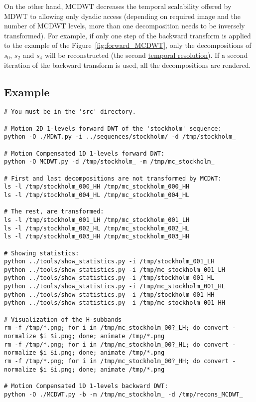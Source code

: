 On the other hand, MCDWT decreases the temporal scalability offered by
MDWT to allowing only dyadic access (depending on required image and
the number of MCDWT levels, more than one decomposition needs to be
inversely transformed). For example, if only one step of the backward
transform is applied to the example of the
Figure~\ref{fig:forward_MCDWT}, only the decompositions of $s_0$,
$s_2$ and $s_4$ will be reconstructed (the second
\href{https://en.wikipedia.org/wiki/Temporal_resolution}{temporal
  resolution}). If a second iteration of the backward transform is
used, all the decompositions are rendered.

\subsection{Example}
\begin{verbatim}
# You must be in the 'src' directory.

# Motion 2D 1-levels forward DWT of the 'stockholm' sequence:
python -O ./MDWT.py -i ../sequences/stockholm/ -d /tmp/stockholm_

# Motion Compensated 1D 1-levels forward DWT:
python -O MCDWT.py -d /tmp/stockholm_ -m /tmp/mc_stockholm_

# First and last decompositions are not transformed by MCDWT:
ls -l /tmp/stockholm_000_HH /tmp/mc_stockholm_000_HH
ls -l /tmp/stockholm_004_HL /tmp/mc_stockholm_004_HL

# The rest, are transformed:
ls -l /tmp/stockholm_001_LH /tmp/mc_stockholm_001_LH
ls -l /tmp/stockholm_002_HL /tmp/mc_stockholm_002_HL
ls -l /tmp/stockholm_003_HH /tmp/mc_stockholm_003_HH

# Showing statistics:
python ../tools/show_statistics.py -i /tmp/stockholm_001_LH
python ../tools/show_statistics.py -i /tmp/mc_stockholm_001_LH
python ../tools/show_statistics.py -i /tmp/stockholm_001_HL
python ../tools/show_statistics.py -i /tmp/mc_stockholm_001_HL
python ../tools/show_statistics.py -i /tmp/stockholm_001_HH
python ../tools/show_statistics.py -i /tmp/mc_stockholm_001_HH

# Visualization of the H-subbands
rm -f /tmp/*.png; for i in /tmp/mc_stockholm_00?_LH; do convert -normalize $i $i.png; done; animate /tmp/*.png
rm -f /tmp/*.png; for i in /tmp/mc_stockholm_00?_HL; do convert -normalize $i $i.png; done; animate /tmp/*.png
rm -f /tmp/*.png; for i in /tmp/mc_stockholm_00?_HH; do convert -normalize $i $i.png; done; animate /tmp/*.png

# Motion Compensated 1D 1-levels backward DWT:
python -O ./MCDWT.py -b -m /tmp/mc_stockholm_ -d /tmp/recons_MCDWT_


\end{verbatim}
